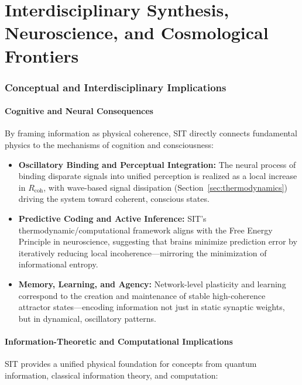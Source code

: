 \part{Interdisciplinary Synthesis, Neuroscience, and Cosmological Frontiers}

\section{Conceptual and Interdisciplinary Implications}
\label{sec:conceptual-implications}

\subsection{Cognitive and Neural Consequences}

By framing information as physical coherence, SIT directly connects fundamental physics to the mechanisms of cognition and consciousness:

\begin{itemize}
    \item \textbf{Oscillatory Binding and Perceptual Integration:}  
    The neural process of binding disparate signals into unified perception is realized as a local increase in $R_{\mathrm{coh}}$, with wave-based signal dissipation (Section~\ref{sec:thermodynamics}) driving the system toward coherent, conscious states.
    \item \textbf{Predictive Coding and Active Inference:}  
    SIT's thermodynamic/computational framework aligns with the Free Energy Principle in neuroscience, suggesting that brains minimize prediction error by iteratively reducing local incoherence---mirroring the minimization of informational entropy.
    \item \textbf{Memory, Learning, and Agency:}  
    Network-level plasticity and learning correspond to the creation and maintenance of stable high-coherence attractor states---encoding information not just in static synaptic weights, but in dynamical, oscillatory patterns.
\end{itemize}

\subsection{Information-Theoretic and Computational Implications}

SIT provides a unified physical foundation for concepts from quantum information, classical information theory, and computation:

